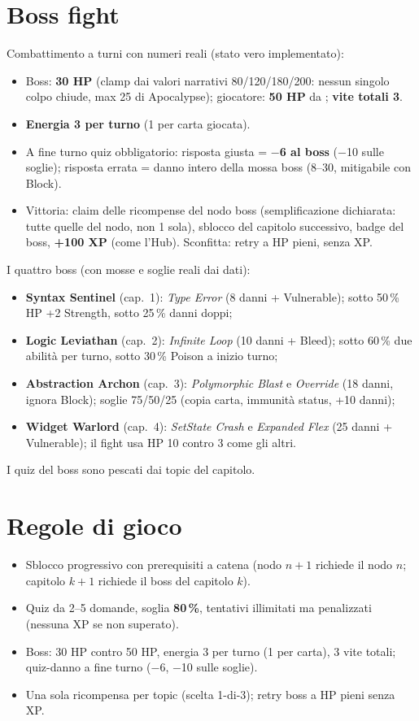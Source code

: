 \section{Boss fight}
Combattimento a turni con numeri reali (stato vero implementato):
\begin{itemize}
\item Boss: \textbf{30 HP} (clamp dai valori narrativi 80/120/180/200:
nessun singolo colpo chiude, max 25 di Apocalypse);
giocatore: \textbf{50 HP} da ; \textbf{vite totali 3}.
\item \textbf{Energia 3 per turno} (1 per carta giocata).
\item A fine turno quiz obbligatorio: risposta giusta = \textbf{$-$6
al boss} ($-$10 sulle soglie); risposta errata = danno intero della
mossa boss (8--30, mitigabile con Block).
\item Vittoria: claim delle ricompense del nodo boss (semplificazione
dichiarata: tutte quelle del nodo, non 1 sola), sblocco del capitolo
successivo, badge del boss, \textbf{+100 XP} (come l'Hub). Sconfitta:
retry a HP pieni, senza XP.
\end{itemize}
I quattro boss (con mosse e soglie reali dai dati):
\begin{itemize}
\item \textbf{Syntax Sentinel} (cap.~1): \textit{Type Error} (8 danni +
Vulnerable); sotto 50\,\% HP +2 Strength, sotto 25\,\% danni doppi;
\item \textbf{Logic Leviathan} (cap.~2): \textit{Infinite Loop} (10
danni + Bleed); sotto 60\,\% due abilit\`a per turno, sotto 30\,\%
Poison a inizio turno;
\item \textbf{Abstraction Archon} (cap.~3): \textit{Polymorphic Blast}
e \textit{Override} (18 danni, ignora Block); soglie 75/50/25
(copia carta, immunit\`a status, +10 danni);
\item \textbf{Widget Warlord} (cap.~4): \textit{SetState Crash} e
\textit{Expanded Flex} (25 danni + Vulnerable); il fight usa HP 10
contro 3 come gli altri.
\end{itemize}
I quiz del boss sono pescati dai topic del capitolo.

\section{Regole di gioco}
\begin{itemize}
\item Sblocco progressivo con prerequisiti a catena (nodo $n{+}1$
richiede il nodo $n$; capitolo $k{+}1$ richiede il boss del capitolo
$k$).
\item Quiz da 2--5 domande, soglia \textbf{80\,\%}, tentativi illimitati ma
penalizzati (nessuna XP se non superato).
\item Boss: 30 HP contro 50 HP, energia 3 per turno (1 per carta), 3 vite
totali; quiz-danno a fine turno ($-$6, $-$10 sulle soglie).
\item Una sola ricompensa per topic (scelta 1-di-3); retry boss a HP
pieni senza XP.
\end{itemize}


